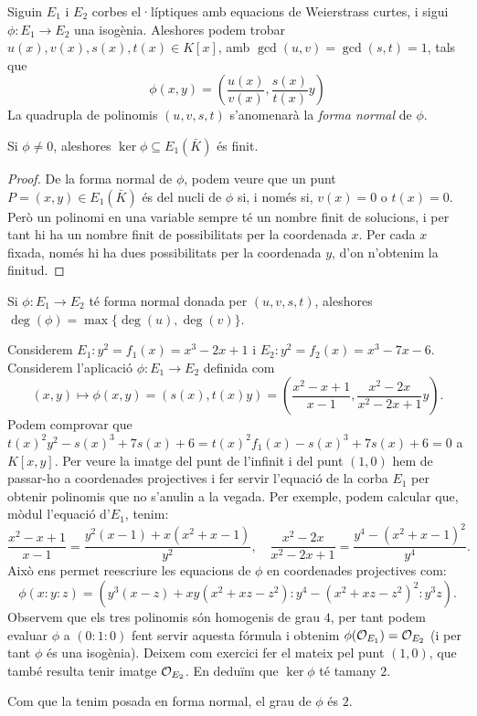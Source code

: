\begin{lemma}
Siguin $E_1$ i $E_2$ corbes el·líptiques amb equacions de Weierstrass curtes, i sigui $\phi\colon E_1\to E_2$ una isogènia. Aleshores podem trobar $u(x),v(x),s(x),t(x)\in K[x]$, amb $\gcd(u,v)=\gcd(s,t)=1$, tals que
\[
\phi(x,y)=\left(\frac{u(x)}{v(x)},\frac{s(x)}{t(x)}y\right)
\]
La quadrupla de polinomis $(u,v,s,t)$ s'anomenarà la \emph{forma normal} de $\phi$.
\end{lemma}
\begin{corollary}
Si $\phi\neq 0$, aleshores $\ker\phi\subseteq E_1(\bar K)$ és finit.
\end{corollary}
\begin{proof}
 De la forma normal de $\phi$, podem veure que un punt $P=(x,y)\in E_1(\bar K)$ és del nucli de $\phi$ si, i només si, $v(x)=0$ o $t(x)=0$. Però un polinomi en una variable sempre té un nombre finit de solucions, i per tant hi ha un nombre finit de possibilitats per la coordenada $x$. Per cada $x$ fixada, només hi ha dues possibilitats per la coordenada $y$, d'on n'obtenim la finitud.
\end{proof}
\begin{proposition}
Si $\phi\colon E_1\to E_2$ té forma normal donada per $(u,v,s,t)$, aleshores $\deg(\phi)=\max\{\deg(u),\deg(v)\}$.
\end{proposition}
\begin{example}
Considerem $E_1\colon y^2=f_1(x)=x^3-2x+1$ i $E_2\colon y^2=f_2(x)=x^3-7x-6$. Considerem l'aplicació $\phi\colon E_1\to E_2$ definida com
\[
(x,y)\mapsto\phi(x,y)=(s(x),t(x)y)= \left(\frac{x^{2} - x + 1}{x - 1}, \frac{x^{2} - 2 x}{x^{2} - 2 x + 1}y\right).
\]
Podem comprovar que $t(x)^2y^2- s(x)^3 +7s(x) +6= t(x)^2 f_1(x)-s(x)^3+7s(x)+6 = 0$ a $K[x,y]$. Per veure la imatge del punt de l'infinit i del punt $(1,0)$ hem de passar-ho a coordenades projectives i fer servir l'equació de la corba $E_1$ per obtenir polinomis que no s'anulin a la vegada. Per exemple, podem calcular que, mòdul l'equació d'$E_1$, tenim:
\[
\frac{x^2-x+1}{x-1} = \frac{y^2(x-1) + x(x^2+x-1)}{y^2}, \quad \frac{x^2-2x}{x^2-2x+1} = \frac{y^4-(x^2+x-1)^2}{y^4}.
\]
Això ens permet reescriure les equacions de $\phi$ en coordenades projectives com:
\[
\phi(x:y:z) = \left(y^3(x-z) + xy(x^2+xz-z^2) : y^4 - (x^2+xz-z^2)^2 : y^3z\right).
\]
Observem que els tres polinomis són homogenis de grau $4$, per tant podem evaluar $\phi$ a $(0:1:0)$ fent servir aquesta fórmula i obtenim $\phi(\mathcal{O}_{E_1}) = \mathcal{O}_{E_2}$ (i per tant $\phi$ és una isogènia). Deixem com exercici fer el mateix pel punt $(1,0)$, que també resulta tenir imatge $\mathcal{O}_{E_2}$. En deduïm que $\ker \phi$ té tamany $2$.

Com que la tenim posada en forma normal, el grau de $\phi$ és $2$.
\end{example}

